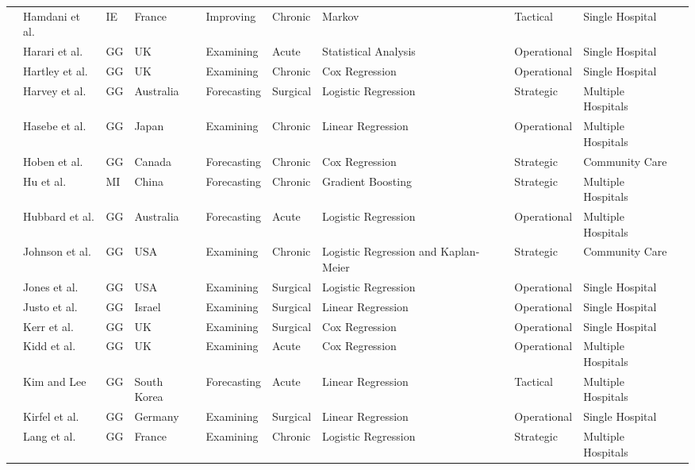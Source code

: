 \documentclass[thesis.tex]{subfiles}
\begin{document}
\begin{landscape}
\begin{table}[H]
{\begin{tabular}{@{}llllllllll@{}}
    \cite{Hamdani} & Hamdani et al. & IE& France & Improving &Chronic & Markov & Tactical & Single Hospital \\
    \cite{Harari2007} & Harari et al. & GG & UK & Examining & Acute & Statistical Analysis & Operational & Single Hospital \\
    \cite{Hartley2019} & Hartley et al. & GG & UK & Examining & Chronic & Cox Regression & Operational & Single Hospital \\
    \cite{Harvey2020} & Harvey et al. & GG & Australia & Forecasting & Surgical & Logistic Regression & Strategic & Multiple Hospitals \\ %
    \cite{Hasebe2018} & Hasebe et al. & GG & Japan & Examining & Chronic & Linear Regression & Operational & Multiple Hospitals \\
    \cite{Hoben2019} & Hoben et al. & GG & Canada & Forecasting & Chronic & Cox Regression & Strategic & Community Care \\
    \cite{Hu2022} & Hu et al. & MI & China & Forecasting & Chronic & Gradient Boosting & Strategic & Multiple Hospitals\\
    \cite{Hubbard2017} & Hubbard et al. & GG & Australia & Forecasting & Acute & Logistic Regression & Operational & Multiple Hospitals \\
    \cite{Johnson2011} & Johnson et al. & GG & USA & Examining & Chronic & Logistic Regression and Kaplan-Meier & Strategic & Community Care \\
    \cite{Jones2021} & Jones et al. & GG & USA & Examining & Surgical & Logistic Regression & Operational & Single Hospital \\
    \cite{Justo2011} & Justo et al. & GG & Israel & Examining & Surgical & Linear Regression & Operational & Single Hospital \\
    \cite{Kerr2006} & Kerr et al. & GG & UK & Examining & Surgical & Cox Regression & Operational & Single Hospital \\
    \cite{Kidd2014} & Kidd et al. & GG & UK & Examining & Acute & Cox Regression & Operational & Multiple Hospitals \\
    \cite{Kim2018} & Kim and Lee & GG & South Korea & Forecasting & Acute & Linear Regression & Tactical & Multiple Hospitals \\ %
    \cite{Kirfel2021} & Kirfel et al. & GG & Germany & Examining & Surgical & Linear Regression & Operational & Single Hospital \\
    \cite{Lang2006} & Lang et al. & GG & France & Examining & Chronic & Logistic Regression & Strategic & Multiple Hospitals \\

\end{tabular}}
\end{table}
\end{landscape}
\end{document}
